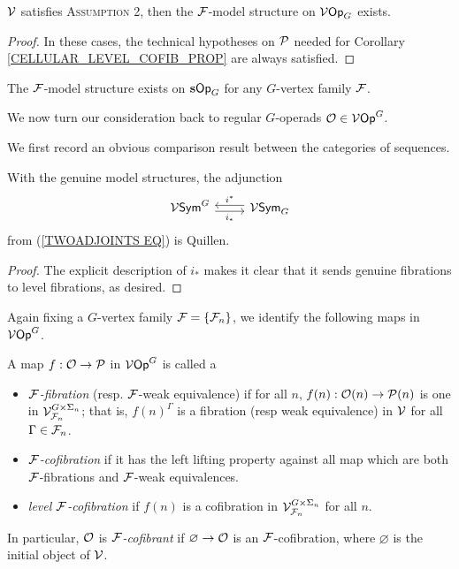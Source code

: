 \documentclass[a4paper,10pt]{article}%
\begin{document}
\begin{theorem} 
  $\V$ satisfies \textsc{Assumption 2}, then the $\F$-model structure on $\V\Op_G$ exists. 
\end{theorem} 
\begin{proof} 
  In these cases, the technical hypotheses on $\P$ needed for Corollary \ref{CELLULAR_LEVEL_COFIB_PROP} are always satisfied. 
\end{proof} 

\begin{example} 
 The $\F$-model structure exists on $\s\Op_G$ for any $G$-vertex family $\F$. 
\end{example} 







\newpage

We now turn our consideration back to regular $G$-operads $\O \in \V\Op^G$.

We first record an obvious comparison result between the categories of sequences.
\begin{lemma}
  With the genuine model structures, the adjunction
\[
\begin{tikzcd}
  \V\Sym^G \arrow[r, shift right, "i_*"'] & \V\Sym_G \arrow[l, shift right, "i^*"'] 
\end{tikzcd}
\]
from (\ref{TWOADJOINTS EQ}) is Quillen.
\end{lemma}
\begin{proof}
  The explicit description of $i_*$ makes it clear that it sends genuine fibrations to level fibrations, as desired.
\end{proof}

Again fixing a $G$-vertex family $\F = \set{\F_n}$, we identify the following maps in $\V\Op^G$.
\begin{definition}
  \label{F_MAPS_DEFINITION}
  A map $f: \O \to \P$ in $\V\Op^G$ is called a
  \begin{itemize}
  \item \textit{$\F$-fibration} (resp. $\F$-weak equivalence) if for all $n$, $f(n): \O(n) \to \P(n)$ is one in $\V^{G \times \Sigma_n}_{\F_n}$; that is, $f(n)^\Gamma$ is a fibration (resp weak equivalence) in $\V$ for all $\Gamma \in \F_n$.
  \item \textit{$\F$-cofibration} if it has the left lifting property against all map which are both $\F$-fibrations and $\F$-weak equivalences. 
  \item \textit{level $\F$-cofibration} if $f(n)$ is a cofibration in $\V^{G\times \Sigma_n}_{\F_n}$ for all $n$.
  \end{itemize}
In particular, $\O$ is \textit{$\F$-cofibrant} if $\varnothing \to \O$ is an $\F$-cofibration, where $\varnothing$ is the initial object of $\V$.
\end{definition}
\end{document}
